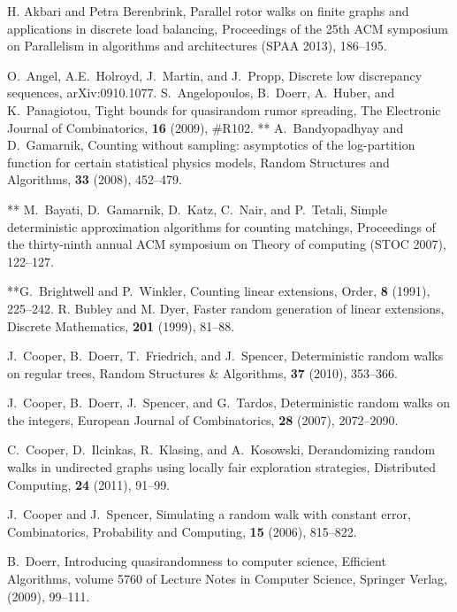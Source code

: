 \documentclass[letter, 11pt]{article}
\newcommand{\1}{\mbox{1}\hspace{-0.25em}\mbox{l}}
\begin{document}

\begin{thebibliography}{99}
 H. Akbari and Petra Berenbrink, 
 Parallel rotor walks on finite graphs and applications in discrete load balancing, 
 Proceedings of the 25th ACM symposium on Parallelism in algorithms and architectures (SPAA 2013), 186--195. 

 O.~Angel, A.E.~Holroyd, J.~Martin, and J.~Propp, 
 Discrete low discrepancy sequences, 
 arXiv:0910.1077. 
 S.~Angelopoulos, B.~Doerr, A.~Huber, and K.~Panagiotou, 
 Tight bounds for quasirandom rumor spreading, 
 The Electronic Journal of Combinatorics, {\bf 16} (2009), {\#}R102.
 ** A.~Bandyopadhyay and D.~Gamarnik, 
 Counting without sampling: asymptotics of the log-partition function for certain statistical physics models, 
 Random Structures and Algorithms, {\bf 33} (2008), 452--479. 

** M.~Bayati, D.~Gamarnik, D.~Katz, C.~Nair, and P.~Tetali, 
 Simple deterministic approximation algorithms for counting matchings, 
 Proceedings of the thirty-ninth annual ACM symposium on Theory of computing (STOC 2007), 
 122--127. 


 **G.~Brightwell and P.~Winkler, 
 Counting linear extensions, 
 Order, {\bf 8} (1991), 225--242. 
\fi
{} 
 R. Bubley and M. Dyer, 
 Faster random generation of linear extensions, 
 Discrete Mathematics, {\bf 201} (1999), 81--88. 

 J.~Cooper, B.~Doerr, T.~Friedrich, and J.~Spencer, 
 Deterministic random walks on regular trees, 
 Random Structures \& Algorithms, {\bf 37} (2010), 353--366. 

 J.~Cooper, B.~Doerr, J.~Spencer, and G.~Tardos, 
 Deterministic random walks on the integers, 
 European Journal of Combinatorics, {\bf 28} (2007), 2072--2090.

 C.~Cooper, D.~Ilcinkas, R.~Klasing, and A.~Kosowski, 
 Derandomizing random walks in undirected graphs using locally fair exploration strategies, 
 Distributed Computing, {\bf 24} (2011), 91--99. 

 J.~Cooper and J.~Spencer, 
 Simulating a random walk with constant error, 
 Combinatorics, Probability and Computing, {\bf 15} (2006), 815--822. 

 B.~Doerr, 
 Introducing quasirandomness to computer science, 
 Efficient Algorithms, volume 5760 of Lecture Notes in Computer Science, Springer Verlag, (2009), 99--111.


\end{thebibliography}
\end{document}
